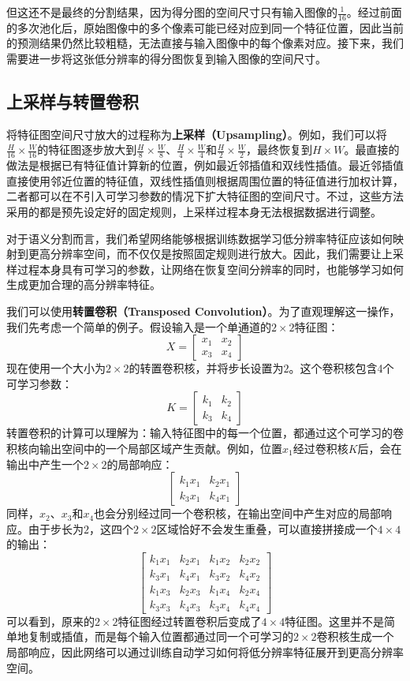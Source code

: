 但这还不是最终的分割结果，因为得分图的空间尺寸只有输入图像的$\frac{1}{16}$。经过前面的多次池化后，原始图像中的多个像素可能已经对应到同一个特征位置，因此当前的预测结果仍然比较粗糙，无法直接与输入图像中的每个像素对应。接下来，我们需要进一步将这张低分辨率的得分图恢复到输入图像的空间尺寸。

\subsection{上采样与转置卷积}

将特征图空间尺寸放大的过程称为\textbf{上采样（Upsampling）}。例如，我们可以将$\frac{H}{16}\times\frac{W}{16}$的特征图逐步放大到$\frac{H}{8}\times\frac{W}{8}$、$\frac{H}{4}\times\frac{W}{4}$和$\frac{H}{2}\times\frac{W}{2}$，最终恢复到$H\times W$。最直接的做法是根据已有特征值计算新的位置，例如最近邻插值和双线性插值。最近邻插值直接使用邻近位置的特征值，双线性插值则根据周围位置的特征值进行加权计算，二者都可以在不引入可学习参数的情况下扩大特征图的空间尺寸。不过，这些方法采用的都是预先设定好的固定规则，上采样过程本身无法根据数据进行调整。

对于语义分割而言，我们希望网络能够根据训练数据学习低分辨率特征应该如何映射到更高分辨率空间，而不仅仅是按照固定规则进行放大。因此，我们需要让上采样过程本身具有可学习的参数，让网络在恢复空间分辨率的同时，也能够学习如何生成更加合理的高分辨率特征。

我们可以使用\textbf{转置卷积（Transposed Convolution）}。为了直观理解这一操作，我们先考虑一个简单的例子。假设输入是一个单通道的$2\times2$特征图：
$$
X=\begin{bmatrix}
x_1 & x_2\\
x_3 & x_4
\end{bmatrix}
$$
现在使用一个大小为$2\times2$的转置卷积核，并将步长设置为$2$。这个卷积核包含4个可学习参数：
$$
K=\begin{bmatrix}
k_1 & k_2\\
k_3 & k_4
\end{bmatrix}
$$
转置卷积的计算可以理解为：输入特征图中的每一个位置，都通过这个可学习的卷积核向输出空间中的一个局部区域产生贡献。例如，位置$x_1$经过卷积核$K$后，会在输出中产生一个$2\times2$的局部响应：
$$
\begin{bmatrix}
k_1x_1 & k_2x_1\\
k_3x_1 & k_4x_1
\end{bmatrix}
$$
同样，$x_2$、$x_3$和$x_4$也会分别经过同一个卷积核，在输出空间中产生对应的局部响应。由于步长为$2$，这四个$2\times2$区域恰好不会发生重叠，可以直接拼接成一个$4\times4$的输出：
$$
\begin{bmatrix}
k_1x_1 & k_2x_1 & k_1x_2 & k_2x_2\\
k_3x_1 & k_4x_1 & k_3x_2 & k_4x_2\\
k_1x_3 & k_2x_3 & k_1x_4 & k_2x_4\\
k_3x_3 & k_4x_3 & k_3x_4 & k_4x_4
\end{bmatrix}
$$
可以看到，原来的$2\times2$特征图经过转置卷积后变成了$4\times4$特征图。这里并不是简单地复制或插值，而是每个输入位置都通过同一个可学习的$2\times2$卷积核生成一个局部响应，因此网络可以通过训练自动学习如何将低分辨率特征展开到更高分辨率空间。

